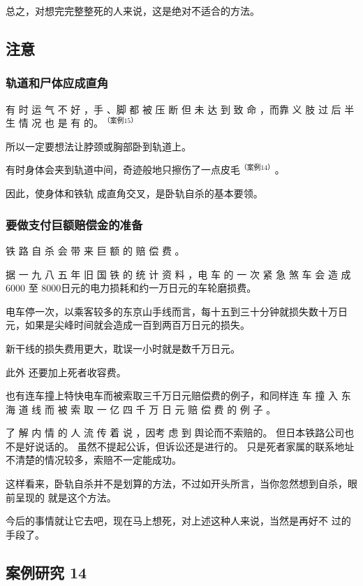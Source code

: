 \documentclass[UTF8]{ctexart}
\begin{document}
总之，对想完完整整死的人来说，这是绝对不适合的方法。

\subsection{注意}

\subsubsection*{轨道和尸体应成直角}

有 时 运 气 不 好 ，手 、脚 都 被 压 断 但 未 达 到 致 命 ，而靠 义 肢 过 后 半 生 情 况 也 是 有 的。$^{（案例15）}$

所以一定要想法让脖颈或胸部卧到轨道上。

有时身体会夹到轨道中间，奇迹般地只擦伤了一点皮毛$^{（案例 14）}$。

因此，使身体和铁轨 成直角交叉，是卧轨自杀的基本要领。 

\subsubsection*{要做支付巨额赔偿金的准备}

铁 路 自 杀 会 带 来 巨 额 的 赔 偿 费 。

据 一 九 八 五 年 旧 国 铁 的 统 计 资 料 ，电 车 的 一 次 紧 急 煞 车 会 造 成$6000$ 至 $8000$日元的电力损耗和约一万日元的车轮磨损费。

电车停一次，以乘客较多的东京山手线而言，每十五到三十分钟就损失数十万日元，如果是尖峰时间就会造成一百到两百万日元的损失。

新干线的损失费用更大，耽误一小时就是数千万日元。

此外 还要加上死者收容费。

也有连车撞上特快电车而被索取三千万日元赔偿费的例子，和同样连 车 撞 入 东 海 道 线 而 被 索 取 一 亿 四 千 万 日 元 赔 偿 费 的 例 子 。

了 解 内 情 的 人 流 传 着 说 ，因考 虑 到 舆论而不索赔的。
但日本铁路公司也不是好说话的。
虽然不提起公诉，但诉讼还是进行的。 
只是死者家属的联系地址不清楚的情况较多，索赔不一定能成功。 

这样看来，卧轨自杀并不是划算的方法，不过如开头所言，当你忽然想到自杀，眼前呈现的 就是这个方法。

今后的事情就让它去吧，现在马上想死，对上述这种人来说，当然是再好不 过的手段了。

\subsection{案例研究 14}
\end{document}

